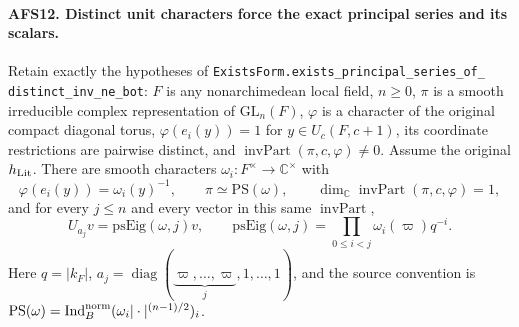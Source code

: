 \paragraph{AFS12. Distinct unit characters force the exact principal series and its scalars.}
\label{claim:AFS12}
Retain exactly the hypotheses of
\texttt{ExistsForm.exists\_principal\_series\_of\_\allowbreak
distinct\_inv\_ne\_bot}:
$F$ is any nonarchimedean local field, $n\geq0$, $\pi$ is a
smooth irreducible complex representation of
$\mathrm{GL}_n(F)$, $\varphi$ is a character of the original
compact diagonal torus, $\varphi(e_i(y))=1$ for
$y\in U_c(F,c+1)$, its coordinate restrictions are pairwise
distinct, and $\operatorname{invPart}(\pi,c,\varphi)\ne0$.
Assume the original $h_{\rm Lit}$.
There are smooth characters $\omega_i:F^\times\to\mathbb C^\times$
with
\[
 \varphi(e_i(y))=\omega_i(y)^{-1},\qquad
 \pi\simeq\mathrm{PS}(\omega),\qquad
 \dim_{\mathbb C}\operatorname{invPart}(\pi,c,\varphi)=1,
\]
and for every $j\leq n$ and every vector in this same
$\operatorname{invPart}$,
\begin{equation}\label{eq:afs-pseig}
 U_{a_j}v=\mathrm{psEig}(\omega,j)v,
 \qquad
 \mathrm{psEig}(\omega,j)=\prod_{0\leq i<j}
                   \omega_i(\varpi)q^{-i}.
\end{equation}
Here $q=|k_F|$, $a_j=\operatorname{diag}
(\underbrace{\varpi,\ldots,\varpi}_{j},1,\ldots,1)$,
and the source convention is
$\mathrm{PS}(\omega)=\operatorname{Ind}^{\rm norm}_B
(\omega_i|\cdot|^{(n-1)/2})_i$.
